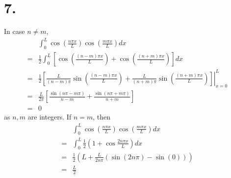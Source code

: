 \documentclass[11pt]{article}
\theoremstyle{mystyle}
\theoremstyle{definition}
\begin{document}
\section*{7.}
In case $n\ne m$, 
\begin{align*}
  &\int_0^L \cos\left(\displaystyle\frac{n\pi x}{L}\right)
  \cos\left(\displaystyle\frac{m\pi x}{L}\right) dx \\
  =& \displaystyle\frac{1}{2} \int_0^L \left[\cos\left(\displaystyle\frac{(n-m)\pi x}{L} \right) + \cos\left(\displaystyle\frac{(n+m)\pi x}{L} \right) \right] dx \\
  =& \displaystyle\frac{1}{2} \left. \left[\displaystyle\frac{L}{(n-m)\pi} \sin\left(\displaystyle\frac{(n-m)\pi x}{L} \right) + \displaystyle\frac{L}{(n+m)\pi}\sin\left(\displaystyle\frac{(n+m)\pi x}{L} \right) \right] \right|_{x=0}^L \\
  =& \displaystyle\frac{L}{2\pi} \left[\displaystyle\frac{\sin(n\pi - m\pi)}{n-m} + \displaystyle\frac{\sin(n\pi + m\pi)}{n+m}\right] \\
  =& 0 
\end{align*}
as $n, m$ are integers. If $n = m$, then 
\begin{align*}
  &\int_0^L \cos\left(\displaystyle\frac{n\pi x}{L}\right) 
  \cos\left(\displaystyle\frac{m\pi x}{L}\right) dx \\
  =& \int_0^L \displaystyle\frac{1}{2} \left(1 + \cos \displaystyle\frac{2n\pi x}{L} \right) dx\\
  =& \displaystyle\frac{1}{2} \left(L + \displaystyle\frac{L}{2n\pi} (\sin(2n\pi) - \sin(0))\right) \\
  =& \displaystyle\frac{L}{2}
\end{align*}
\newpage
\end{document}
